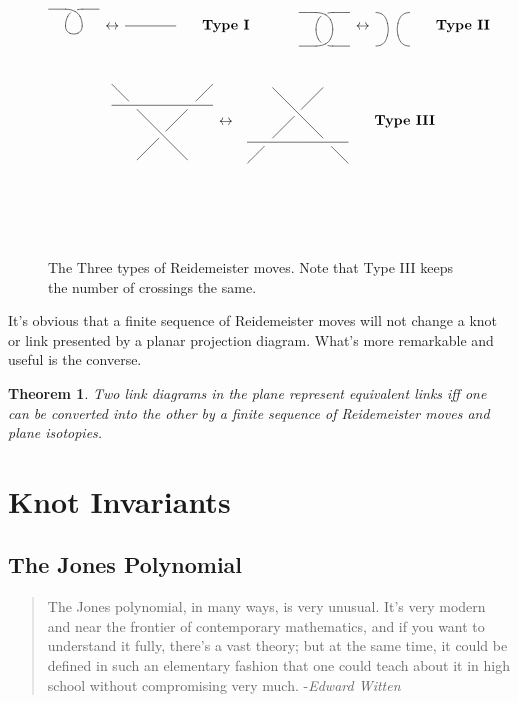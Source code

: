 \documentclass[a4paper,titlepage,twoside]{book}
\newtheorem{theorem}{Theorem}
\begin{document}
\begin{figure}[h]
\[ 
\begin{gathered}
  \xygraph{
      !{0;/r1.0pc/:}
      [u]
      !{\vover}
      !{\vcap-}
      [ul]!{\xcaph@(0)}
      [r]!{\xcaph@(0)}
     } \, \leftrightarrow \,
     \xygraph{
      !{0;/r1.0pc/:} [uu]
      !{\xcaph[3]@(0)}
   }  \quad \, \text{ \textbf{ Type I }}
\quad \quad \quad \, 
  \xygraph{
      !{0;/r1.0pc/:}
      [u(0.8)]
      !{\xcaph@(0)}
      !{\vover}
      !{\vunder-}
      [l]!{\xcaph@(0)}
      [r]!{\xcaph@(0)}
      [uul]!{\xcaph@(0)}
    } \, \leftrightarrow \,
    \xygraph{
      !{0;/r1.0pc/:}
      [u(0.8)]!{\huncross[2]}
    } 
\quad \, \text{ \textbf{ Type II } } \\
\quad \quad \, \\
  \xygraph{
      !{0;/r1.0pc/:}
      [u(0.7)]
      !{\xoverh[3]}
      [ull][ul(0.5)]!{\sbendv@(0)}
      [rrrr]!{\sbendh@(0)}
      [llllll][d(1.25)]!{\xcaph[-6]@(0)}
    } \, \leftrightarrow \,
    \xygraph{
      !{0;/r1.0pc/:}
      [uu]
      !{\xoverh[3]}
      [lldddd][ld(0.5)]!{\sbendh@(0)}
      [rrrr]!{\sbendv@(0)}
      [llllll][u(1.25)]!{\xcaph[-6]@(0)}
} \quad \, \text{ \textbf{ Type III } }
\end{gathered}  
\]
\caption{ The Three types of Reidemeister moves.  Note that Type III keeps the number of crossings the same. }
\end{figure}

It's obvious that a finite sequence of Reidemeister moves will not change a knot or link presented by a planar projection diagram.  What's more remarkable and useful is the converse.  

\begin{theorem}
  Two link diagrams in the plane represent equivalent links iff one can be converted into the other by a finite sequence of Reidemeister moves and plane isotopies.  
\end{theorem}

\section{Knot Invariants }

\subsection{The Jones Polynomial }\label{subsec:TheJonesPolynomial}

\begin{quote}
 The Jones polynomial, in many ways, is very unusual. It's very modern and near the frontier of contemporary mathematics, and if you want to understand it fully, there's a vast theory; but at the same time, it could be defined in such an elementary fashion that one could teach about it in high school without compromising very much.  -\emph{Edward Witten }
\end{quote}
\end{document}
